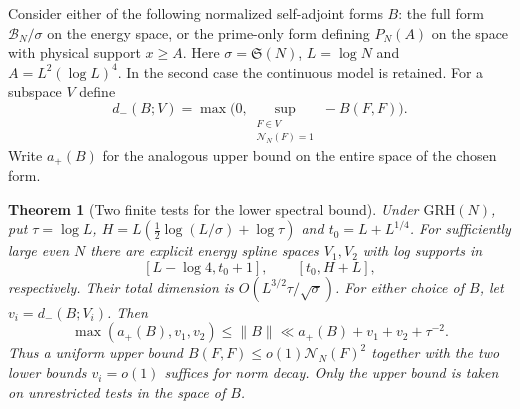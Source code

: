 \documentclass[11pt,a4paper]{article}
\numberwithin{equation}{section}
\newtheorem{theorem}{Theorem}[section]
\newcommand{\SSS}{\mathfrak S}
\newcommand{\grh}{\mathrm{GRH}}
\newcommand{\B}{\mathcal B_N}
\newcommand{\NN}{\mathcal N_N}
\begin{document}
Consider either of the following normalized self-adjoint forms $B$:
the full form $\B/\sigma$ on the energy space, or the prime-only
form defining $P_N(A)$ on the space with physical support $x\ge A$.
Here $\sigma=\SSS(N)$, $L=\log N$ and $A=L^2(\log L)^4$.
In the second case the continuous model is retained. For a
subspace $V$ define
\[
 d_-(B;V)=\max\bigl(0,\sup_{\substack{F\in V\\\NN(F)=1}}
                              -B(F,F)\bigr).
\]
Write $a_+(B)$ for the analogous upper bound on the entire
space of the chosen form.

\begin{theorem}[Two finite tests for the lower spectral bound]
\label{thm:lower-edge}
Under $\grh(N)$, put $\tau=\log L$,
$H=L(\tfrac12\log(L/\sigma)+\log\tau)$ and $t_0=L+L^{1/4}$.
For sufficiently large even $N$ there are explicit energy spline
spaces $V_1,V_2$ with log supports in
\[
 [L-\log4,t_0+1],\qquad [t_0,H+L],
\]
respectively. Their total dimension is $O(L^{3/2}\tau/\sqrt\sigma)$.
For either choice of $B$, let $v_i=d_-(B;V_i)$. Then
\begin{equation}
 \max(a_+(B),v_1,v_2)\le\|B\|
 \ll a_+(B)+v_1+v_2+\tau^{-2}.
 \label{eq:lower-edge}
\end{equation}
Thus a uniform upper bound $B(F,F)\le o(1)\NN(F)^2$ together
with the two lower bounds $v_i=o(1)$ suffices for norm decay.
Only the upper bound is taken on unrestricted tests in the
space of $B$.
\end{theorem}
\end{document}
